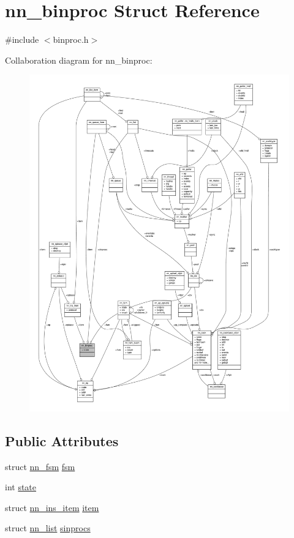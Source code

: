 \hypertarget{structnn__binproc}{}\section{nn\+\_\+binproc Struct Reference}
\label{structnn__binproc}


{\ttfamily \#include $<$binproc.\+h$>$}



Collaboration diagram for nn\+\_\+binproc\+:\nopagebreak
\begin{figure}[H]
\begin{center}
\leavevmode
\includegraphics[width=350pt]{structnn__binproc__coll__graph}
\end{center}
\end{figure}
\subsection*{Public Attributes}
\begin{DoxyCompactItemize}
\item 
struct \hyperlink{structnn__fsm}{nn\+\_\+fsm} \hyperlink{structnn__binproc_ad152292e85dd03c76b5a04bf1b1c2312}{fsm}
\item 
int \hyperlink{structnn__binproc_a4a221bbc12129b2ce30068c90154f798}{state}
\item 
struct \hyperlink{structnn__ins__item}{nn\+\_\+ins\+\_\+item} \hyperlink{structnn__binproc_a83a82b2df7063407e75ee23708b7bbe1}{item}
\item 
struct \hyperlink{structnn__list}{nn\+\_\+list} \hyperlink{structnn__binproc_aafb4a9584de9f07138980df5521d06a2}{sinprocs}
\end{DoxyCompactItemize}


